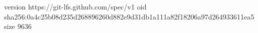 version https://git-lfs.github.com/spec/v1
oid sha256:0a4c25b08d235d268896260d882e9d31db1a111a82f18206a97d264933611ea5
size 9636
